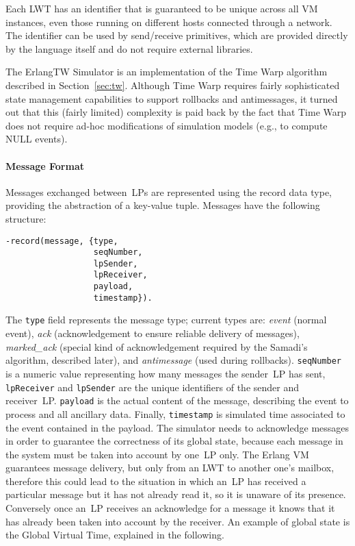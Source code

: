 \documentclass{sigplanconf}
\begin{document}
Each LWT has an identifier that is guaranteed to be unique across all
VM instances, even those running on different hosts connected through
a network. The identifier can be used by send/receive primitives,
which are provided directly by the language itself and do not require
external libraries.

The ErlangTW Simulator is an implementation of the Time Warp algorithm
described in Section~\ref{sec:tw}. Although Time Warp requires fairly
sophisticated state management capabilities to support rollbacks and
antimessages, it turned out that this (fairly limited) complexity is
paid back by the fact that Time Warp does not require ad-hoc
modifications of simulation models (e.g., to compute NULL events).

\paragraph*{Message Format}
Messages exchanged between~\acp{LP} are represented using the record
data type, providing the abstraction of a key-value tuple. Messages
have the following structure:

\begin{verbatim}
-record(message, {type, 
                  seqNumber, 
                  lpSender, 
                  lpReceiver, 
                  payload, 
                  timestamp}).
\end{verbatim}

The \verb+type+ field represents the message type; current types are:
\emph{event} (normal event), \emph{ack} (acknowledgement to ensure
reliable delivery of messages), \emph{marked\_ack} (special kind of
acknowledgement required by the Samadi's algorithm, described later),
and \emph{antimessage} (used during rollbacks).  \verb+seqNumber+ is a
numeric value representing how many messages the sender~\ac{LP} has
sent, \verb+lpReceiver+ and \verb+lpSender+ are the unique identifiers
of the sender and receiver~\ac{LP}.  \verb+payload+ is the actual
content of the message, describing the event to process and all
ancillary data. Finally, \verb+timestamp+ is simulated time associated
to the event contained in the payload.  The simulator needs to
acknowledge messages in order to guarantee the correctness of its
global state, because each message in the system must be taken into
account by one~\ac{LP} only. The Erlang VM guarantees message
delivery, but only from an LWT to another one's mailbox, therefore
this could lead to the situation in which an~\ac{LP} has received a
particular message but it has not already read it, so it is unaware of
its presence. Conversely once an~\ac{LP} receives an acknowledge for a
message it knows that it has already been taken into account by the
receiver. An example of global state is the Global Virtual Time,
explained in the following.
\end{document}
